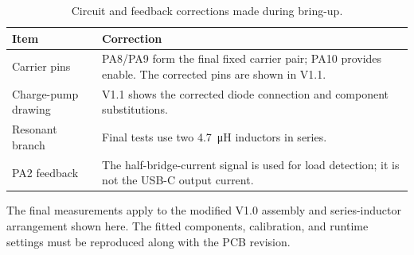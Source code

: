 \begin{table}[H]
\centering
\caption{Circuit and feedback corrections made during bring-up.}
\label{tab:hardware-implementation-lessons}
\begin{tabularx}{\textwidth}{@{}p{}X@{}}
\toprule
Item & Correction\\
\midrule
Carrier pins & PA8/PA9 form the final fixed carrier pair; PA10 provides enable. The corrected pins are shown in V1.1.\\
Charge-pump drawing & V1.1 shows the corrected diode connection and component substitutions.\\
Resonant branch & Final tests use two \SI{4.7}{\micro\henry} inductors in series.\\
PA2 feedback & The half-bridge-current signal is used for load detection; it is not the USB-C output current.\\
\bottomrule
\end{tabularx}
\end{table}

The final measurements apply to the modified V1.0 assembly and series-inductor arrangement shown here. The fitted components, calibration, and runtime settings must be reproduced along with the PCB revision.
